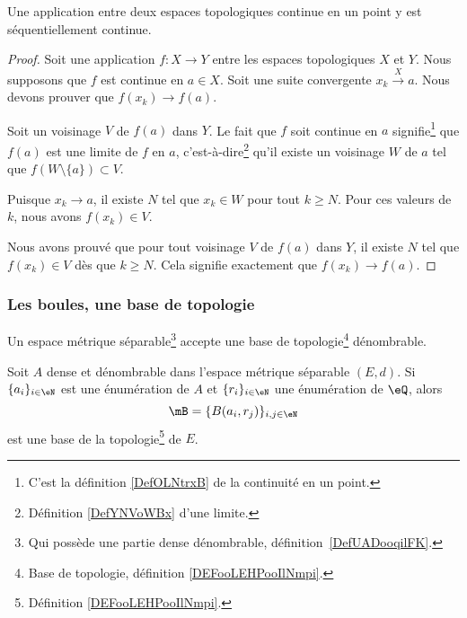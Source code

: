 \begin{corollary}		\label{PropFnContParSuite}
	Une application entre deux espaces topologiques continue en un point y est séquentiellement continue.
\end{corollary}

\begin{proof}
	Soit une application \( f\colon X\to Y\) entre les espaces topologiques \( X\) et \( Y\). Nous supposons que \( f\) est continue en \( a\in X\). Soit une suite convergente \( x_k\stackrel{X}{\longrightarrow}a\). Nous devons prouver que \( f(x_k)\to f(a)\).

	Soit un voisinage \( V\) de \( f(a)\) dans \( Y\). Le fait que \( f\) soit continue en \( a\) signifie\footnote{C'est la définition \ref{DefOLNtrxB} de la continuité en un point.} que \( f(a)\) est une limite de \( f\) en \( a\), c'est-à-dire\footnote{Définition \ref{DefYNVoWBx} d'une limite.} qu'il existe un voisinage \( W\) de \( a\) tel que \( f(W\setminus\{ a \})\subset V\).

	Puisque \( x_k\to a\), il existe \( N\) tel que \( x_k\in W\) pour tout \( k\geq N\). Pour ces valeurs de \( k\), nous avons \( f(x_k)\in V\).

	Nous avons prouvé que pour tout voisinage \( V\) de \( f(a)\) dans \( Y\), il existe \( N\) tel que \( f(x_k)\in V\) dès que \( k\geq N\). Cela signifie exactement que \( f(x_k)\to f(a)\).
\end{proof}

\subsubsection{Les boules, une base de topologie}

\begin{proposition} \label{PropNBSooraAFr}
	Un espace métrique séparable\footnote{Qui possède une partie dense dénombrable, définition~\ref{DefUADooqilFK}.} accepte une base de topologie\footnote{Base de topologie, définition \ref{DEFooLEHPooIlNmpi}.} dénombrable.

	Soit \( A\) dense et dénombrable dans l'espace métrique séparable \( (E,d)\). Si \( \{ a_i \}_{i\in \eN}\) est une énumération de \( A\) et \( \{ r_i \}_{i\in \eN}\) une énumération de \( \eQ\), alors
	\begin{equation}
		\mB=\{ B(a_i,r_j) \}_{i,j\in \eN}
	\end{equation}
	est une base de la topologie\footnote{Définition \ref{DEFooLEHPooIlNmpi}.} de \( E\).
\end{proposition}

